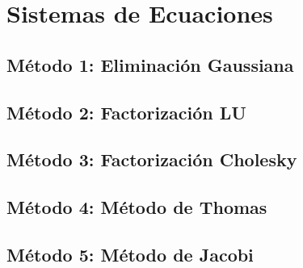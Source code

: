 \documentclass[10pt,a4paper]{article}
\begin{document}
	\section{Sistemas de Ecuaciones}
	
	\subsection{Método 1: Eliminación Gaussiana}
	
	

	\subsection{Método 2: Factorización LU}
	
	
	
	\subsection{Método 3: Factorización Cholesky}
	

	\subsection{Método 4: Método de Thomas}
	
	
				
	\subsection{Método 5: Método de Jacobi}
	
		
					
\end{document}
